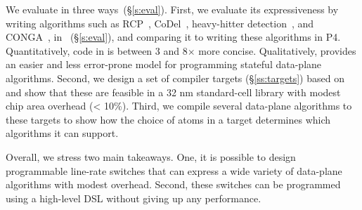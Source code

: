 We evaluate \pktlanguage in three ways~(\S\ref{s:eval}). First, we evaluate its
expressiveness by writing algorithms such as RCP~\cite{rcp},
CoDel~\cite{codel}, heavy-hitter detection~\cite{opensketch}, and
CONGA~\cite{conga}, in \pktlanguage~(\S\ref{s:eval}), and comparing it to
writing these algorithms in P4. Quantitatively, code in \pktlanguage is between
3 and 8$\times$ more concise. Qualitatively, \pktlanguage provides an easier
and less error-prone model for programming stateful data-plane algorithms.
Second, we design a set of compiler targets (\S\ref{ss:targets}) based on
\absmachine and show that these are feasible in a 32 nm standard-cell library
with modest chip area overhead (< 10\%). Third, we compile several data-plane
algorithms to these targets to show how the choice of atoms in a target
determines which algorithms it can support.

Overall, we stress two main takeaways. One, it is possible to design
programmable line-rate switches that can express a wide variety of data-plane
algorithms with modest overhead. Second, these switches can be programmed using
a high-level DSL without giving up any performance.
